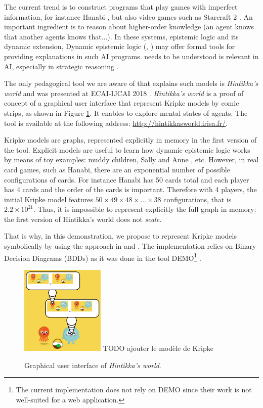 The current trend is to construct programs that play games with imperfect information, for instance Hanabi \cite{DBLP:journals/corr/abs-1902-00506}, but also video games such as Starcraft 2 \cite{DBLP:conf/ijcai/HuLLPX18}. An important ingredient is to reason about higher-order knowledge (an agent knows that another agents knows that...). In these systems, epistemic logic and its dynamic extension, Dynamic epistemic logic (\cite{baltag1998logic}, \cite{DitmarschvdHoekKooi}) may offer formal tools for providing explanations in such AI programs. needs to be understood is relevant in AI, especially in strategic reasoning \cite{DBLP:journals/ijgt/Aumann99}.

The only pedagogical tool we are aware of that explains such models is \emph{Hintikka's world} and was presented at ECAI-IJCAI 2018 \cite{DBLP:conf/ijcai/Schwarzentruber18}. 
\emph{Hintikka's world} is a proof of concept of a graphical user interface that represent Kripke models by  comic strips, as shown in Figure \ref{figure:gui}. It enables to explore mental states of agents. The tool is available at the following address:
\url{http://hintikkasworld.irisa.fr/}. 


Kripke models are graphs, represented explicitly in memory in the first version of the tool. Explicit models are useful to learn how dynamic epistemic logic works by means of toy examples: muddy children, Sally and Anne  \cite{wimmer1983beliefs}, etc.  However, in real card games, such as Hanabi, there are an exponential number of possible configurations of cards. For instance Hanabi has 50 cards total and each player has 4 cards and the order of the cards is important. Therefore with 4 players, the initial Kripke model features $50 \times 49 \times 48 \times \dots \times 38$ configurations, that is $2.2 \times 10^{21}$. Thus, it is impossible to represent explicitly the full graph in memory:  the first version of Hintikka's world does not \emph{scale}. 

That is why, in this demonstration, we propose to represent Kripke models symbolically by using the approach in \cite{DBLP:conf/atal/CharrierS17} and \cite{DBLP:conf/aiml/CharrierS18}. The implementation relies on Binary Decision Diagrams (BDDs) \cite{} as it was done in the tool DEMO\footnote{The current implementation does not rely on DEMO since their work is not well-suited for a web application.}  \cite{DBLP:conf/lori/BenthemEGS15}. 






\begin{figure}
	\begin{center}
		\includegraphics[width=4cm]{screenshot.png} TODO ajouter le modèle de Kripke
	\end{center}
	\caption{Graphical user interface of \emph{Hintikka's world}.\label{figure:gui}}
\end{figure}
